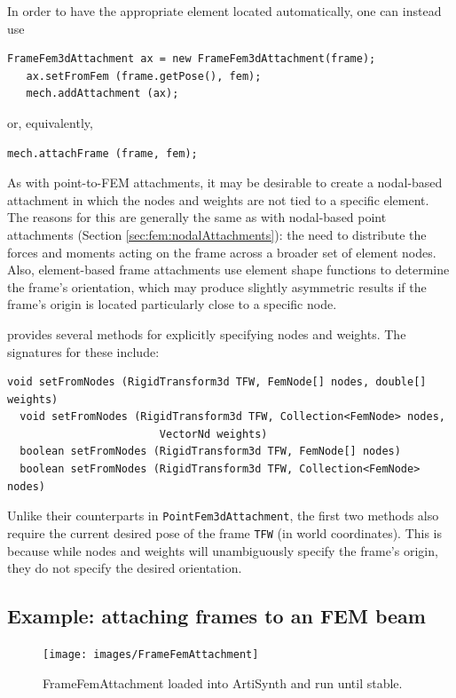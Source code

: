 In order to have the appropriate element located automatically,
one can instead use
%
\begin{lstlisting}[]
   FrameFem3dAttachment ax = new FrameFem3dAttachment(frame);
   ax.setFromFem (frame.getPose(), fem);
   mech.addAttachment (ax);
\end{lstlisting}
%
or, equivalently, 
%
\begin{lstlisting}[]
   mech.attachFrame (frame, fem);
\end{lstlisting}
%

As with point-to-FEM attachments, it may be desirable to create a
nodal-based attachment in which the nodes and weights are not tied to
a specific element. The reasons for this are generally the same as
with nodal-based point attachments (Section
\ref{sec:fem:nodalAttachments}): the need to distribute the forces and
moments acting on the frame across a broader set of element nodes.
Also, element-based frame attachments use element shape functions to
determine the frame's orientation, which may produce slightly
asymmetric results if the frame's origin is located particularly close
to a specific node.

 provides
several methods for explicitly specifying nodes and weights. The
signatures for these include:
\begin{lstlisting}[]
  void setFromNodes (RigidTransform3d TFW, FemNode[] nodes, double[] weights)
  void setFromNodes (RigidTransform3d TFW, Collection<FemNode> nodes, 
                        VectorNd weights)
  boolean setFromNodes (RigidTransform3d TFW, FemNode[] nodes)
  boolean setFromNodes (RigidTransform3d TFW, Collection<FemNode> nodes)
\end{lstlisting}
Unlike their counterparts in {\tt PointFem3dAttachment}, the first two
methods also require the current desired pose of the frame {\tt TFW}
(in world coordinates).  This is because while nodes and weights will
unambiguously specify the frame's origin, they do not specify the
desired orientation.

\subsection{Example: attaching frames to an FEM beam}

\begin{figure}[ht]
	\centering
	\texttt{[image: images/FrameFemAttachment]}
	\caption{FrameFemAttachment loaded into ArtiSynth and run until stable.}
	\label{fig:fem:frameFemAttachment}
\end{figure}


